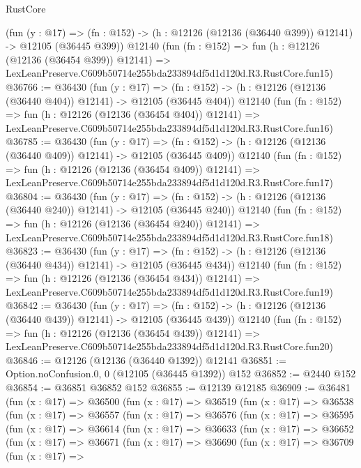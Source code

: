 \begin{lexlean}{RustCore}
\begin{coremodule}
    (fun (y : @17) =>
    (fn : @152) -> (h : @12126 (@12136 (@36440 @399)) @12141) -> @12105 (@36445 @399))
    @12140
    (fun (fn : @152) =>
    fun (h : @12126 (@12136 (@36454 @399)) @12141) =>
    LexLeanPreserve.C609b50714e255bda233894df5d1d120d.R3.RustCore.fun15)
@36766 := @36430
    (fun (y : @17) =>
    (fn : @152) -> (h : @12126 (@12136 (@36440 @404)) @12141) -> @12105 (@36445 @404))
    @12140
    (fun (fn : @152) =>
    fun (h : @12126 (@12136 (@36454 @404)) @12141) =>
    LexLeanPreserve.C609b50714e255bda233894df5d1d120d.R3.RustCore.fun16)
@36785 := @36430
    (fun (y : @17) =>
    (fn : @152) -> (h : @12126 (@12136 (@36440 @409)) @12141) -> @12105 (@36445 @409))
    @12140
    (fun (fn : @152) =>
    fun (h : @12126 (@12136 (@36454 @409)) @12141) =>
    LexLeanPreserve.C609b50714e255bda233894df5d1d120d.R3.RustCore.fun17)
@36804 := @36430
    (fun (y : @17) =>
    (fn : @152) -> (h : @12126 (@12136 (@36440 @240)) @12141) -> @12105 (@36445 @240))
    @12140
    (fun (fn : @152) =>
    fun (h : @12126 (@12136 (@36454 @240)) @12141) =>
    LexLeanPreserve.C609b50714e255bda233894df5d1d120d.R3.RustCore.fun18)
@36823 := @36430
    (fun (y : @17) =>
    (fn : @152) -> (h : @12126 (@12136 (@36440 @434)) @12141) -> @12105 (@36445 @434))
    @12140
    (fun (fn : @152) =>
    fun (h : @12126 (@12136 (@36454 @434)) @12141) =>
    LexLeanPreserve.C609b50714e255bda233894df5d1d120d.R3.RustCore.fun19)
@36842 := @36430
    (fun (y : @17) =>
    (fn : @152) -> (h : @12126 (@12136 (@36440 @439)) @12141) -> @12105 (@36445 @439))
    @12140
    (fun (fn : @152) =>
    fun (h : @12126 (@12136 (@36454 @439)) @12141) =>
    LexLeanPreserve.C609b50714e255bda233894df5d1d120d.R3.RustCore.fun20)
@36846 := @12126 (@12136 (@36440 @1392)) @12141
@36851 := Option.noConfusion.{0, 0} (@12105 (@36445 @1392)) @152
@36852 := @2440 @152
@36854 := @36851 @36852 @152
@36855 := @12139 @12185
@36909 := @36481
    (fun (x : @17) =>
    @36500
      (fun (x : @17) =>
      @36519
        (fun (x : @17) =>
        @36538
          (fun (x : @17) =>
          @36557
            (fun (x : @17) =>
            @36576
              (fun (x : @17) =>
              @36595
                (fun (x : @17) =>
                @36614
                  (fun (x : @17) =>
                  @36633
                    (fun (x : @17) =>
                    @36652
                      (fun (x : @17) =>
                      @36671
                        (fun (x : @17) =>
                        @36690
                          (fun (x : @17) =>
                          @36709
                            (fun (x : @17) =>

\end{coremodule}
\end{lexlean}
